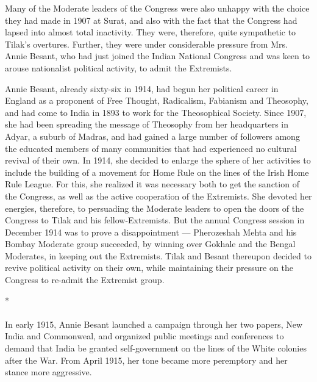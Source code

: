 \begin{multicols}{2}
Many of the Moderate leaders of the Congress were also unhappy with the choice they had made in 1907 at Surat, and also with the fact that the Congress had lapsed into almost total inactivity. They were, therefore, quite sympathetic to Tilak's overtures. Further, they were under considerable pressure from Mrs. Annie Besant, who had just joined the Indian National Congress and was keen to arouse nationalist political activity, to admit the Extremists.

Annie Besant, already sixty-six in 1914, had begun her political career in England as a proponent of Free Thought, Radicalism, Fabianism and Theosophy, and had come to India in 1893 to work for the Theosophical Society. Since 1907, she had been spreading the message of Theosophy from her headquarters in Adyar, a suburb of Madras, and had gained a large number of followers among the educated members of many communities that had experienced no cultural revival of their own. In 1914, she decided to enlarge the sphere of her activities to include the building of a movement for Home Rule on the lines of the Irish Home Rule League. For this, she realized it was necessary both to get the sanction of the Congress, as well as the active cooperation of the Extremists. She devoted her energies, therefore, to persuading the Moderate leaders to open the doors of the Congress to Tilak and his fellow-Extremists. But the annual Congress session in December 1914 was to prove a disappointment --- Pherozeshah Mehta and his Bombay Moderate group succeeded, by winning over Gokhale and the Bengal Moderates, in keeping out the Extremists. Tilak and Besant thereupon decided to revive political activity on their own, while maintaining their pressure on the Congress to re-admit the Extremist group.

\begin{center}*\end{center}

\paragraph*{}
In early 1915, Annie Besant launched a campaign through her two papers, New India and Commonweal, and organized public meetings and conferences to demand that India be granted self-government on the lines of the White colonies after the War. From April 1915, her tone became more peremptory and her stance more aggressive.


\end{multicols}
